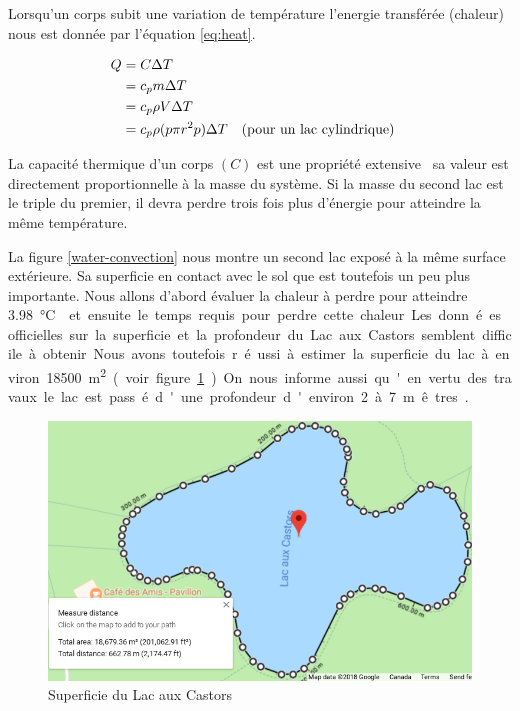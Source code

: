 \documentclass[12pt]{article}
\newcommand\critical{\SI{3.98}\celsius}
\numberwithin{figure}{section}
\numberwithin{table}{section}
\begin{document}
Lorsqu'un corps subit une variation de temp\'erature l'energie transf\'er\'ee
(chaleur)~\cite{Q-equation} nous est donn\'ee par l'\'equation \eqref{eq:heat}.

\begin{align}
    Q &= C\Delta T\label{eq:heat}\\
    &= c_pm\Delta T\notag\\
    &= c_p\rho V\Delta T\notag\\
    &= c_p\rho (p\pi r^2p)\Delta T &&\text{(pour un lac cylindrique)}\notag
\end{align}

La capacit\'e thermique d'un corps $(C)$ est une propri\'et\'e extensive~\cite{Extensive} sa valeur
est directement proportionnelle \`a la masse du syst\`eme. Si la masse du second lac est le triple
du premier, il devra perdre trois fois plus d'\'energie pour atteindre la m\^eme temp\'erature.

La figure \ref{water-convection} nous montre un second lac expos\'e \`a la m\^eme surface
ext\'erieure. Sa superficie en contact avec le sol que est toutefois un peu plus importante. Nous
allons d'abord \'evaluer la chaleur \`a perdre pour atteindre \critical{} et ensuite le temps requis
pour perdre cette chaleur.

Les donn\'ees officielles sur la superficie et la profondeur du Lac aux Castors semblent difficile
\`a obtenir. Nous avons toutefois r\'eussi \`a estimer la superficie du lac \`a environ
\SI{18500}{\square\meter} (voir figure \ref{google-castor}). On nous informe aussi qu'en vertu des
travaux le lac est pass\'e d'une profondeur d'environ 2 \`a 7 m\^etres~\cite{Lac-Castor}.

\begin{figure}
    \centering
    \includegraphics[scale=0.5]{Superficie.png}
    \caption{Superficie du Lac aux Castors}\label{google-castor}
\end{figure}
\end{document}
